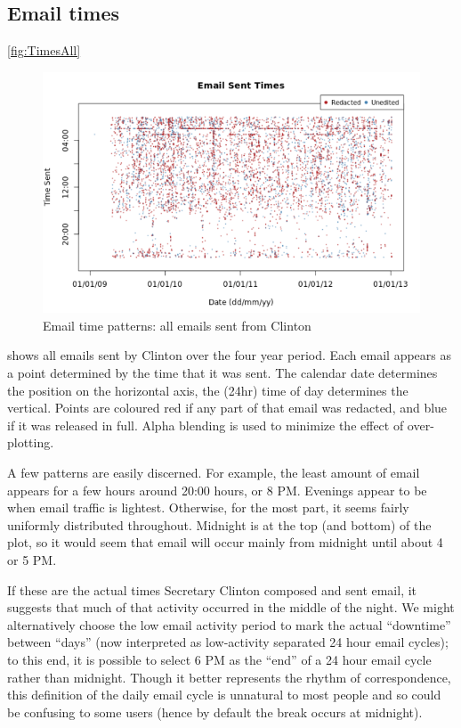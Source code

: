 \documentclass[journal]{vgtc}                %
\begin{document}
\subsection{Email times}
\label{sect:Displays:times}
\autoref{fig:TimesAll}  
\begin{figure}[h]
\begin{center}
\includegraphics[width=0.95\linewidth]{DailyFullTimeFromClinton}
\caption{Email time patterns: all emails sent from Clinton}
\label{fig:TimesAll}
\end{center}
\end{figure}
shows all emails sent by Clinton over the four year period.  Each email appears as a point determined by the time that it was sent.  The calendar date determines the position on the horizontal axis,  the (24hr) time of day determines the vertical.   Points are coloured red if any part of that email was redacted, and blue if it was released in full.   Alpha blending is used to minimize the effect of over-plotting.
 
A few patterns are easily discerned.  For example, the least amount of email appears for a few hours around  20:00 hours, or 8 PM.  Evenings appear to be when email traffic is lightest.  Otherwise, for the most part, it seems fairly uniformly distributed throughout.  Midnight is at the top (and bottom) of the plot, so it would seem that email will occur mainly from midnight until about 4 or 5 PM.   

If these are the actual times Secretary Clinton composed and sent email, it suggests that much of that activity occurred in the middle of the night.  We might alternatively choose the low email activity period to mark the actual ``downtime'' between ``days'' (now interpreted as low-activity separated 24 hour email cycles);   to this end, it is possible to select 6 PM as the ``end'' of a 24 hour email cycle rather than midnight.   Though it better represents the rhythm of correspondence, this definition of the daily email cycle is unnatural to most people and so could be confusing to some users (hence by default the break occurs at midnight). 
\end{document}
